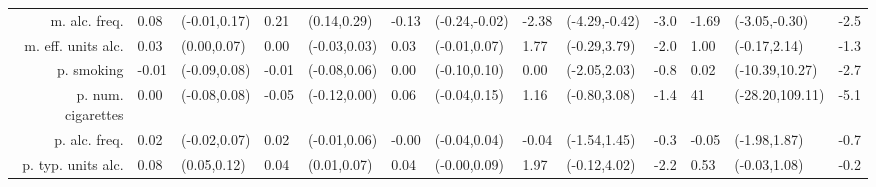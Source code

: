 \begin{tabular}{rLlLlLlLlLLlL}
m. alc.  freq. & 0.08 & (-0.01,0.17) & 0.21 & (0.14,0.29) & -0.13 & (-0.24,-0.02) & -2.38 & (-4.29,-0.42) & -3.0 & -1.69 & (-3.05,-0.30) & -2.5 \\
m. eff. units alc. & 0.03 & (0.00,0.07) & 0.00 & (-0.03,0.03) & 0.03 & (-0.01,0.07) & 1.77 & (-0.29,3.79) & -2.0 & 1.00 & (-0.17,2.14) & -1.3 \\
p. smoking & -0.01 & (-0.09,0.08) & -0.01 & (-0.08,0.06) & 0.00 & (-0.10,0.10) & 0.00 & (-2.05,2.03) & -0.8 & 0.02 & (-10.39,10.27) & -2.7 \\
p. num. cigarettes & 0.00 & (-0.08,0.08) & -0.05 & (-0.12,0.00) & 0.06 & (-0.04,0.15) & 1.16 & (-0.80,3.08) & -1.4 & 41 & (-28.20,109.11) & -5.1 \\
p. alc.  freq. & 0.02 & (-0.02,0.07) & 0.02 & (-0.01,0.06) & -0.00 & (-0.04,0.04) & -0.04 & (-1.54,1.45) & -0.3 & -0.05 & (-1.98,1.87) & -0.7 \\
p. typ. units alc. & 0.08 & (0.05,0.12) & 0.04 & (0.01,0.07) & 0.04 & (-0.00,0.09) & 1.97 & (-0.12,4.02) & -2.2 & 0.53 & (-0.03,1.08) & -0.2 \\

\hline
\end{tabular}
